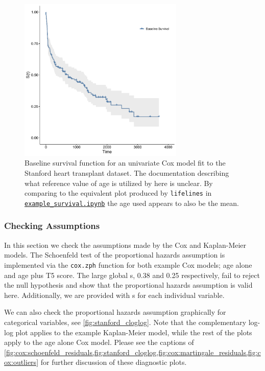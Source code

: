 \begin{figure}[H]
\centering
\includegraphics[width=0.7\textwidth]{figures/survival/stanford_cox_age_baseline_survival}
\vspace{0.2cm}
\caption{
Baseline survival function for
an univariate Cox model fit to the Stanford heart transplant dataset.
The documentation describing what reference value of age is utilized by \R here is unclear.
By comparing to the equivalent plot produced by \texttt{lifelines} in
\href{https://github.com/mepland/data_science_notes/blob/main/sections/appendixes/additional/example_survival.ipynb}{\texttt{example\_survival.ipynb}}
the age used appears to also be the mean.
}
\label{fig:cox:cox_age_baseline_survival}
\end{figure}

\subsubsection{Checking Assumptions}
\label{survival:Rcode:assumptions}

In this section we check the assumptions made by the Cox and Kaplan-Meier models.
The Schoenfeld test of the proportional hazards assumption
is implemented via the \texttt{cox.zph} function
for both example Cox models; age alone and age plus T5 score.
The large global {\pvalue}s, \num{0.38} and \num{0.25} respectively,
fail to reject the null hypothesis and show that the
proportional hazards assumption is valid here.
Additionally, we are provided with {\pvalue}s for each individual variable.

We can also check the proportional hazards assumption graphically
for categorical variables, see \cref{fig:stanford_cloglog}.
Note that the complementary log-log plot applies to the example Kaplan-Meier model,
while the rest of the plots apply to the age alone Cox model.
Please see the captions of
\cref{fig:cox:schoenfeld_residuals,fig:stanford_cloglog,fig:cox:martingale_residuals,fig:cox:outliers}
for further discussion of these diagnostic plots.

